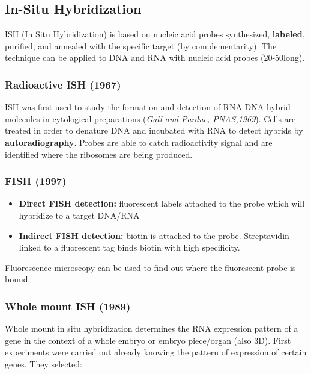 \hypertarget{in-situ-hybridization}{%
\subsection{In-Situ Hybridization}\label{in-situ-hybridization}}

ISH (In Situ Hybridization) is based on nucleic acid probes synthesized,
\textbf{labeled}, purified, and annealed with the specific target (by
complementarity). The technique can be applied to DNA and RNA with
nucleic acid probes (20-50long).

\hypertarget{radioactive-ish-1967}{%
\subsubsection{Radioactive ISH (1967)}\label{radioactive-ish-1967}}

ISH was first used to study the formation and detection of RNA-DNA
hybrid molecules in cytological preparations (\emph{Gall and Pardue,
PNAS,1969}).  Cells are treated in order to denature DNA and
incubated with RNA to detect hybrids by \textbf{autoradiography}. Probes
are able to catch radioactivity signal and are identified where the
ribosomes are being produced.

\hypertarget{fish-1997}{%
\subsubsection{FISH (1997)}\label{fish-1997}}

\begin{itemize}
\tightlist
\item
  \textbf{Direct FISH detection:} fluorescent labels attached to the
  probe which will hybridize to a target DNA/RNA
\item
  \textbf{Indirect FISH detection:} biotin is attached to the probe.
  Streptavidin linked to a fluorescent tag binds biotin with high
  specificity.
\end{itemize}

Fluorescence microscopy can be used to find out where the fluorescent
probe is bound.

\hypertarget{whole-mount-ish-1989}{%
\subsubsection{\texorpdfstring{\textbf{Whole mount ISH
(1989)}}{Whole mount ISH (1989)}}\label{whole-mount-ish-1989}}

Whole mount in situ hybridization determines the RNA expression pattern
of a gene in the context of a whole embryo or embryo piece/organ (also
3D). First experiments were carried out already knowing the pattern of
expression of certain genes. They selected:

